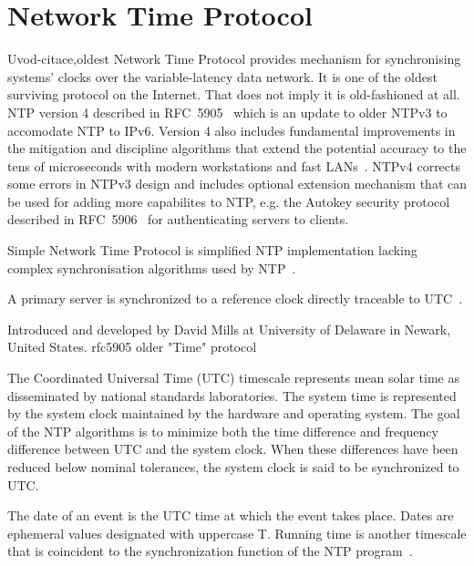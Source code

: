 
\chapter{Network Time Protocol}
\!Uvod-citace,oldest
Network Time Protocol provides mechanism for synchronising systems' clocks over the variable-latency data network.
It is one of the oldest surviving protocol on the Internet. That does not imply it is old-fashioned
at all. NTP version 4 described in RFC~5905~\cite{rfc5905} which is an update to older NTPv3 to accomodate
NTP to IPv6. Version 4 also includes fundamental improvements in
the mitigation and discipline algorithms that extend
the potential accuracy to the tens of microseconds with modern
workstations and fast LANs~\cite{rfc5905}. NTPv4 corrects some
errors in NTPv3 design and includes optional extension mechanism
that can be used for adding more capabilites to NTP, e.g. the
Autokey security protocol described in RFC~5906~\cite{rfc5906}
for authenticating servers to clients.

Simple Network Time Protocol is simplified NTP implementation lacking complex
synchronisation algorithms used by NTP~\cite{rfc4330}.

A primary server is synchronized to a reference clock directly traceable
to UTC~\cite{rfc5905}.

\! Introduced and developed by David Mills at University of Delaware in Newark, United States.
\! rfc5905
\! older "Time" protocol


The Coordinated Universal Time (UTC) timescale represents mean solar
   time as disseminated by national standards laboratories.  The system
   time is represented by the system clock maintained by the hardware
   and operating system.  The goal of the NTP algorithms is to minimize
   both the time difference and frequency difference between UTC and the
   system clock.  When these differences have been reduced below nominal
   tolerances, the system clock is said to be synchronized to UTC.



   The date of an event is the UTC time at which the event takes place.
   Dates are ephemeral values designated with uppercase T.  Running time
   is another timescale that is coincident to the synchronization
   function of the NTP program~\cite{rfc5905}.



